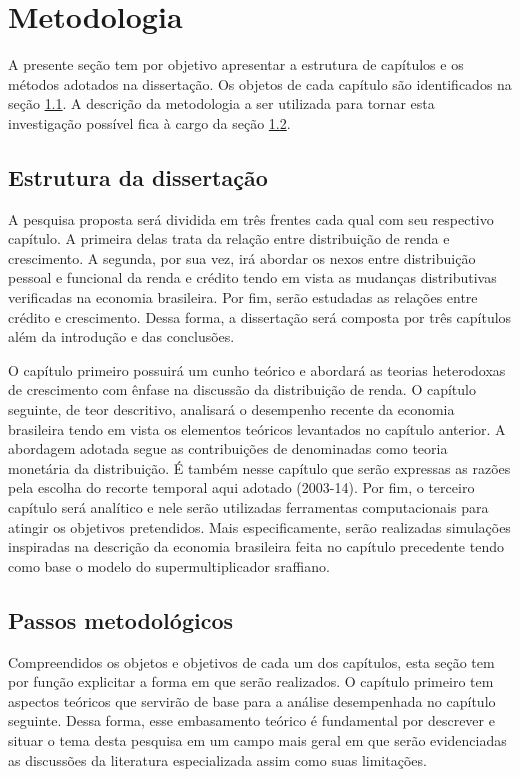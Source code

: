 \section{Metodologia}\label{Metodo}

A presente seção tem por objetivo apresentar a estrutura de capítulos e os métodos adotados na dissertação. Os objetos de cada capítulo são identificados na seção \ref{estrut}.
A descrição da metodologia a ser utilizada para tornar esta investigação possível fica à cargo da seção \ref{passos}.

\subsection{Estrutura da dissertação}\label{estrut}
A pesquisa proposta será dividida em três frentes cada qual com seu respectivo capítulo.
A primeira delas trata da relação entre distribuição de renda e crescimento. A segunda, por sua vez, irá abordar os nexos entre distribuição pessoal e funcional da renda e crédito tendo em vista as mudanças distributivas verificadas na economia brasileira. Por fim, serão estudadas as relações entre crédito e crescimento. 
Dessa forma, a dissertação será composta por três capítulos além da introdução e das conclusões.  

O capítulo primeiro possuirá um cunho teórico e abordará as teorias heterodoxas de crescimento com ênfase na discussão da distribuição de renda. O capítulo seguinte, de teor descritivo, analisará o desempenho recente da economia brasileira tendo em vista os elementos teóricos levantados no capítulo anterior. A abordagem adotada segue as contribuições de \textcite{pivetti_essay_1992} denominadas como teoria monetária da distribuição. É também nesse capítulo que serão expressas as razões pela escolha do recorte temporal aqui adotado (2003-14). Por fim, o terceiro capítulo será analítico e nele serão utilizadas ferramentas computacionais para atingir os objetivos pretendidos. Mais especificamente, serão realizadas simulações inspiradas na descrição da economia brasileira feita no capítulo precedente tendo como base o modelo do supermultiplicador sraffiano.

\subsection{Passos metodológicos}\label{passos}
Compreendidos os objetos e objetivos de cada um dos capítulos, esta seção tem por função explicitar a forma em que serão realizados. O capítulo primeiro tem aspectos teóricos que servirão de base para a análise desempenhada no capítulo seguinte. Dessa forma, esse embasamento teórico é fundamental por descrever e situar o tema desta pesquisa em um campo mais geral em que serão evidenciadas as discussões da literatura especializada assim como suas limitações. 

